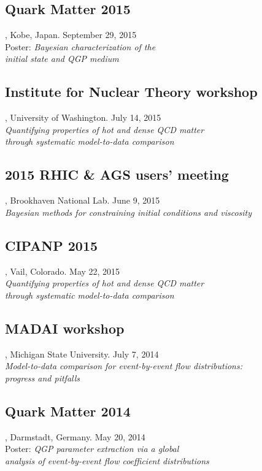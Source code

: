\documentclass[letterpaper,10pt]{article}
\begin{document}
\subsection{Quark Matter 2015}, Kobe, Japan. \hfill September 29, 2015 \\
Poster: \emph{Bayesian characterization of the \\ initial state and QGP medium}

\subsection{Institute for Nuclear Theory workshop}, University of Washington. \hfill July 14, 2015 \\
\emph{Quantifying properties of hot and dense QCD matter \\ through systematic model-to-data comparison}

\subsection{2015 RHIC \& AGS users' meeting}, Brookhaven National Lab. \hfill June 9, 2015 \\
\emph{Bayesian methods for constraining initial conditions and viscosity}

\subsection{CIPANP 2015}, Vail, Colorado. \hfill May 22, 2015 \\
\emph{Quantifying properties of hot and dense QCD matter \\ through systematic model-to-data comparison}

\subsection{MADAI workshop}, Michigan State University. \hfill July 7, 2014 \\
\emph{Model-to-data comparison for event-by-event flow distributions: \\ progress and pitfalls}

\subsection{Quark Matter 2014}, Darmstadt, Germany. \hfill May 20, 2014 \\
Poster: \emph{QGP parameter extraction via a global \\ analysis of event-by-event flow coefficient distributions}
\end{document}
